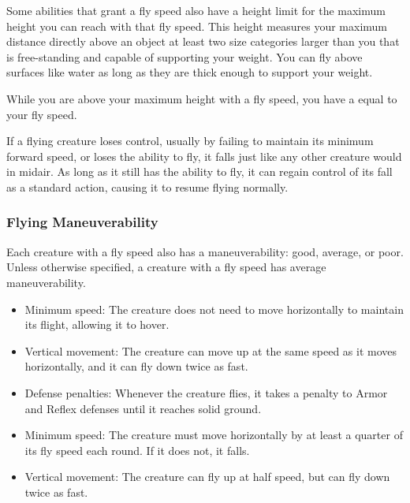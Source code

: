         \label{Height Limit} Some abilities that grant a fly speed also have a height limit for the maximum height you can reach with that fly speed.
        This height measures your maximum distance directly above an object at least two size categories larger than you that is free-standing and capable of supporting your weight.
        You can fly above surfaces like water as long as they are thick enough to support your weight.

        While you are above your maximum height with a fly speed, you have a  equal to your fly speed.

         If a flying creature loses control, usually by failing to maintain its minimum forward speed, or loses the ability to fly, it falls just like any other creature would in midair. As long as it still has the ability to fly, it can regain control of its fall as a standard action, causing it to resume flying normally.

        \subsubsection{Flying Maneuverability}\label{Flying Maneuverability}
        Each creature with a fly speed also has a maneuverability: good, average, or poor.
        Unless otherwise specified, a creature with a fly speed has average maneuverability.

            \begin{itemize}
                \item Minimum speed: The creature does not need to move horizontally to maintain its flight, allowing it to hover.
                \item Vertical movement: The creature can move up at the same speed as it moves horizontally, and it can fly down twice as fast.
            \end{itemize}

            \begin{itemize}
                \item Defense penalties: Whenever the creature flies, it takes a  penalty to Armor and Reflex defenses until it reaches solid ground.
                \item Minimum speed: The creature must move horizontally by at least a quarter of its fly speed each round. If it does not, it falls.
                \item Vertical movement: The creature can fly up at half speed, but can fly down twice as fast.
            \end{itemize}

